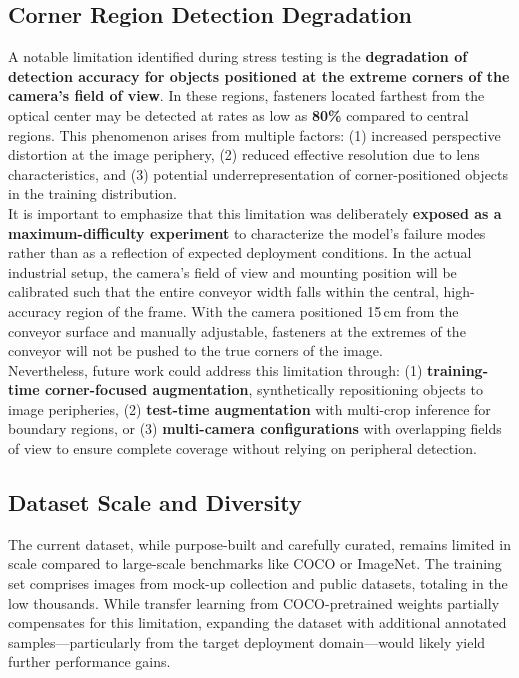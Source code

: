 \subsection{Corner Region Detection Degradation}

A notable limitation identified during stress testing is the \textbf{degradation of detection accuracy for objects positioned at the extreme corners of the camera's field of view}. In these regions, fasteners located farthest from the optical center may be detected at rates as low as \textbf{80\%} compared to central regions. This phenomenon arises from multiple factors: (1) increased perspective distortion at the image periphery, (2) reduced effective resolution due to lens characteristics, and (3) potential underrepresentation of corner-positioned objects in the training distribution.\\

It is important to emphasize that this limitation was deliberately \textbf{exposed as a maximum-difficulty experiment} to characterize the model's failure modes rather than as a reflection of expected deployment conditions. In the actual industrial setup, the camera's field of view and mounting position will be calibrated such that the entire conveyor width falls within the central, high-accuracy region of the frame. With the camera positioned 15\,cm from the conveyor surface and manually adjustable, fasteners at the extremes of the conveyor will not be pushed to the true corners of the image.\\

Nevertheless, future work could address this limitation through: (1) \textbf{training-time corner-focused augmentation}, synthetically repositioning objects to image peripheries, (2) \textbf{test-time augmentation} with multi-crop inference for boundary regions, or (3) \textbf{multi-camera configurations} with overlapping fields of view to ensure complete coverage without relying on peripheral detection.

\subsection{Dataset Scale and Diversity}

The current dataset, while purpose-built and carefully curated, remains limited in scale compared to large-scale benchmarks like COCO or ImageNet. The training set comprises images from mock-up collection and public datasets, totaling in the low thousands. While transfer learning from COCO-pretrained weights partially compensates for this limitation, expanding the dataset with additional annotated samples---particularly from the target deployment domain---would likely yield further performance gains.

